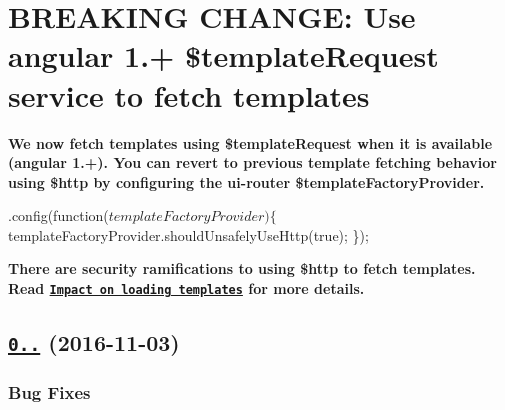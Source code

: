 {\bfseries {\bfseries \section*{B\+R\+E\+A\+K\+I\+NG C\+H\+A\+N\+GE\+: Use angular 1.+ {\ttfamily \$template\+Request} service to fetch templates}}}

{\bfseries {\bfseries }}

{\bfseries {\bfseries We now fetch templates using {\ttfamily \$template\+Request} when it is available (angular 1.+). You can revert to previous template fetching behavior using {\ttfamily \$http} by configuring the ui-\/router {\ttfamily \$template\+Factory\+Provider}.}}

{\bfseries {\bfseries 
\begin{DoxyCode}
.config(function($templateFactoryProvider) \{
  $templateFactoryProvider.shouldUnsafelyUseHttp(true);
\});
\end{DoxyCode}
}}

{\bfseries {\bfseries There are security ramifications to using {\ttfamily \$http} to fetch templates. Read \href{https://docs.angularjs.org/api/ng/service/$sce#impact-on-loading-templates}{\tt Impact on loading templates} for more details.}}

{\bfseries {\bfseries \label{_0.3.2}%
 \subsection*{\href{https://github.com/angular-ui/ui-router/compare/0.3.1...0.3.2}{\tt 0..} (2016-\/11-\/03)}}}

{\bfseries {\bfseries }}

{\bfseries {\bfseries \subsubsection*{Bug Fixes}}}

{\bfseries {\bfseries }}

